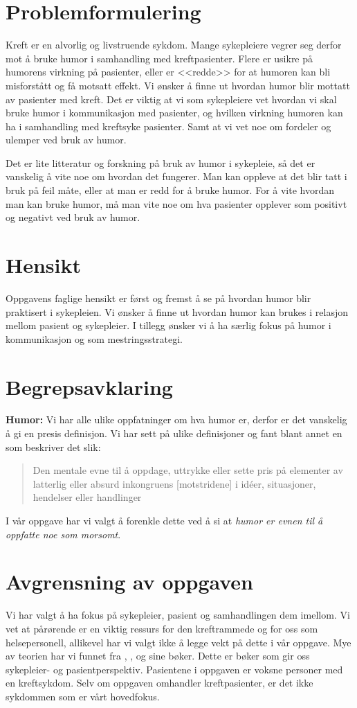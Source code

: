 \section{Problemformulering}

Kreft er en alvorlig og livstruende sykdom. Mange sykepleiere vegrer seg derfor
mot å bruke humor i samhandling med kreftpasienter. Flere er usikre på humorens
virkning på pasienter, eller er <<redde>> for at humoren kan bli misforstått og
få motsatt effekt. Vi ønsker å finne ut hvordan humor blir mottatt av pasienter
med kreft. Det er viktig at vi som sykepleiere vet hvordan vi skal bruke humor
i kommunikasjon med pasienter, og hvilken virkning humoren kan ha i samhandling
med kreftsyke pasienter. Samt at vi vet noe om fordeler og ulemper ved bruk av
humor.

Det er lite litteratur og forskning på bruk av humor i sykepleie, så det er
vanskelig å vite noe om hvordan det fungerer. Man kan oppleve at det blir tatt
i bruk på feil måte, eller at man er redd for å bruke humor. For å vite hvordan
man kan bruke humor, må man vite noe om hva pasienter opplever som positivt og
negativt ved bruk av humor.

\section{Hensikt}

Oppgavens faglige hensikt er først og fremst å se på hvordan humor blir
praktisert i sykepleien. Vi ønsker å finne ut hvordan humor kan brukes i
relasjon mellom pasient og sykepleier. I tillegg ønsker vi å ha særlig fokus på
humor i kommunikasjon og som mestringsstrategi.

\section{Begrepsavklaring}

\textbf{Humor:} Vi har alle ulike oppfatninger om hva humor er, derfor er det
vanskelig å gi en presis definisjon. Vi har sett på ulike definisjoner
og fant blant annet en som beskriver det slik:
\blockquote[{}]{Den mentale evne til å oppdage,
uttrykke eller sette pris på elementer av latterlig eller absurd inkongruens
[motstridene] i idéer, situasjoner, hendelser eller handlinger}.  I vår oppgave
har vi valgt å forenkle dette ved å si at \textit{humor er evnen til å oppfatte
noe som morsomt}.

\section{Avgrensning av oppgaven}

Vi har valgt å ha fokus på sykepleier, pasient og samhandlingen dem imellom.
Vi vet at pårørende er en viktig ressurs for den kreftrammede og for oss som
helsepersonell, allikevel har vi valgt ikke å legge vekt på dette i vår
oppgave. Mye av teorien har vi funnet fra ,
,  og  sine bøker. Dette
er bøker som gir oss sykepleier- og pasientperspektiv. Pasientene i oppgaven er
voksne personer med en kreftsykdom.  Selv om oppgaven omhandler kreftpasienter,
er det ikke sykdommen som er vårt hovedfokus.

